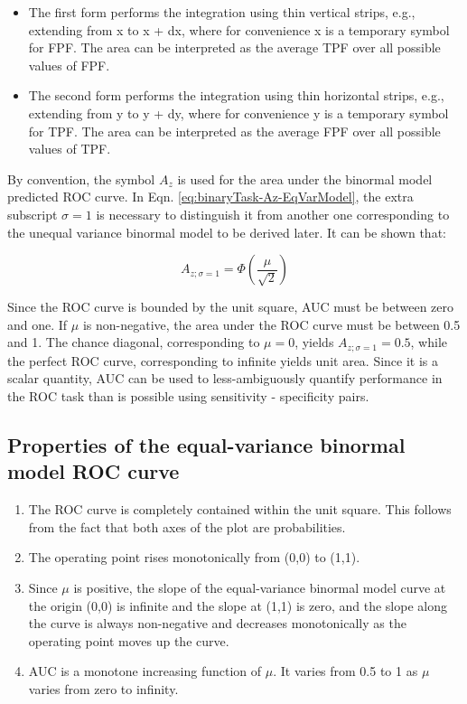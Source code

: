 \documentclass[
]{book}
\providecommand{\tightlist}{%
  \setlength{\itemsep}{0pt}\setlength{\parskip}{0pt}}
\begin{document}
\begin{itemize}
\tightlist
\item
  The first form performs the integration using thin vertical strips, e.g., extending from x to x + dx, where for convenience x is a temporary symbol for FPF. The area can be interpreted as the average TPF over all possible values of FPF.
\item
  The second form performs the integration using thin horizontal strips, e.g., extending from y to y + dy, where for convenience y is a temporary symbol for TPF. The area can be interpreted as the average FPF over all possible values of TPF.
\end{itemize}

By convention, the symbol \(A_z\) is used for the area under the binormal model predicted ROC curve. In Eqn. \eqref{eq:binaryTask-Az-EqVarModel}, the extra subscript \(\sigma = 1\) is necessary to distinguish it from another one corresponding to the unequal variance binormal model to be derived later. It can be shown that:

\begin{equation} 
A_{z;\sigma = 1} = \Phi\left ( \frac{\mu} {\sqrt{2}} \right )
\label{eq:binaryTask-Az-EqVarModel2}
\end{equation}

Since the ROC curve is bounded by the unit square, AUC must be between zero and one. If \(\mu\) is non-negative, the area under the ROC curve must be between 0.5 and 1. The chance diagonal, corresponding to \(\mu = 0\), yields \(A_{z;\sigma = 1} = 0.5\), while the perfect ROC curve, corresponding to infinite yields unit area. Since it is a scalar quantity, AUC can be used to less-ambiguously quantify performance in the ROC task than is possible using sensitivity - specificity pairs.

\hypertarget{properties-of-the-equal-variance-binormal-model-roc-curve}{%
\subsection{Properties of the equal-variance binormal model ROC curve}\label{properties-of-the-equal-variance-binormal-model-roc-curve}}

\begin{enumerate}
\def\labelenumi{\alph{enumi}.}
\tightlist
\item
  The ROC curve is completely contained within the unit square. This follows from the fact that both axes of the plot are probabilities.
\item
  The operating point rises monotonically from (0,0) to (1,1).
\item
  Since \(\mu\) is positive, the slope of the equal-variance binormal model curve at the origin (0,0) is infinite and the slope at (1,1) is zero, and the slope along the curve is always non-negative and decreases monotonically as the operating point moves up the curve.
\item
  AUC is a monotone increasing function of \(\mu\). It varies from 0.5 to 1 as \(\mu\) varies from zero to infinity.
\end{enumerate}
\end{document}

